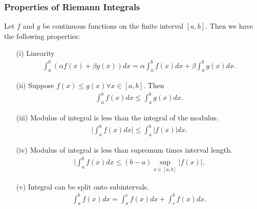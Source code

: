 \documentclass{article}
\numberwithin{theorem}{subsection}
\numberwithin{theorem}{subsubsection}
\numberwithin{lemma}{subsection}
\numberwithin{lemma}{subsubsection}
\theoremstyle{definition}
\numberwithin{definition}{subsection}
\numberwithin{definition}{subsubsection}
\begin{document}
\subsubsection{Properties of Riemann Integrals}
Let $f$ and $g$ be continuous functions on the finite interval $[a,b]$. Then we have the following properties:
\begin{itemize}
    \item[(i)] Linearity
        \begin{gather}
            \int_{a}^{b} (\alpha f(x) + \beta g(x))dx = \alpha\int_{a}^{b}f(x)dx + \beta\int_{a}^{b}g(x)dx.
        \end{gather}
        \item[(ii)] Suppose $f(x) \leq g(x) \forall x\in [a,b]$. Then
            \begin{gather}
                \int_{a}^{b} f(x)dx \leq \int_{a}^{b}g(x)dx.
            \end{gather}
        \item[(iii)] Modulus of integral is less than the integral of the modulus.
            \begin{gather}
                \bigg\lvert \int_{a}^{b} f(x)dx \bigg\rvert \leq \int_{a}^{b}|f(x)|dx.
            \end{gather}
        \item[(iv)] Modulus of integral is less than supremum times interval length.
            \begin{gather}
                \bigg\lvert \int_{a}^{b}f(x)dx \leq (b-a) \sup_{x\in [a,b]}|f(x)|.
            \end{gather}
        \item[(v)] Integral can be split onto subintervals.
            \begin{gather}
                \int_{a}^{b}f(x)dx = \int_{a}^{c}f(x)dx + \int_{c}^{b}f(x)dx.
            \end{gather}
\end{itemize}

\newpage
\begin{comment}
======================================================================================================================================================================================================================================================================================COMPLEX ANALYSIS================================================ ====================================================================================================================================================================================================================================
\end{comment}
\end{document}
